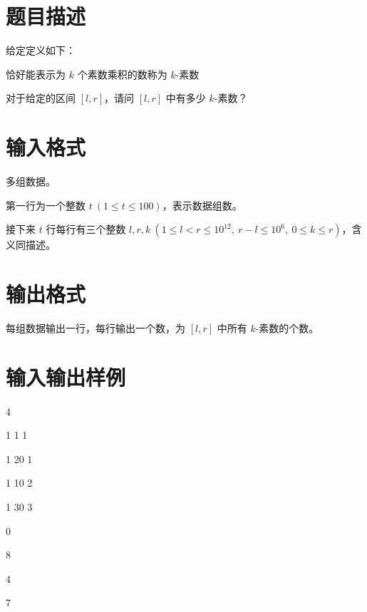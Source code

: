 \documentclass{../cpct/ctpro}
\begin{document}
\makeproblem
\section*{题目描述}

给定定义如下：

\begin{definition}[$k$-素数]
    恰好能表示为 $k$ 个素数乘积的数称为 $k$-素数
\end{definition}

对于给定的区间 $[l,r]$，请问 $[l,r]$ 中有多少 $k$-素数？

\section*{输入格式}

多组数据。

第一行为一个整数 $t~(1 \leq t \leq 100)$，表示数据组数。

接下来 $t$ 行每行有三个整数 $l,r,k~(1 \leq l<r \leq {10}^{12},~r-l\leq {10}^6,~0 \leq k \leq r)$，含义同描述。

\section*{输出格式}

每组数据输出一行，每行输出一个数，为 $[l,r]$ 中所有 $k$-素数的个数。

\section*{输入输出样例}

\testcasetab
{
    4\par
    1 1 1\par
    1 20 1\par
    1 10 2\par
    1 30 3
}
{
    0\par
    8\par
    4\par
    7
}
\end{document}
